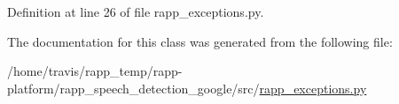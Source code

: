 Definition at line 26 of file rapp\-\_\-exceptions.\-py.



The documentation for this class was generated from the following file\-:\begin{DoxyCompactItemize}
\item 
/home/travis/rapp\-\_\-temp/rapp-\/platform/rapp\-\_\-speech\-\_\-detection\-\_\-google/src/\hyperlink{rapp__speech__detection__google_2src_2rapp__exceptions_8py}{rapp\-\_\-exceptions.\-py}\end{DoxyCompactItemize}
